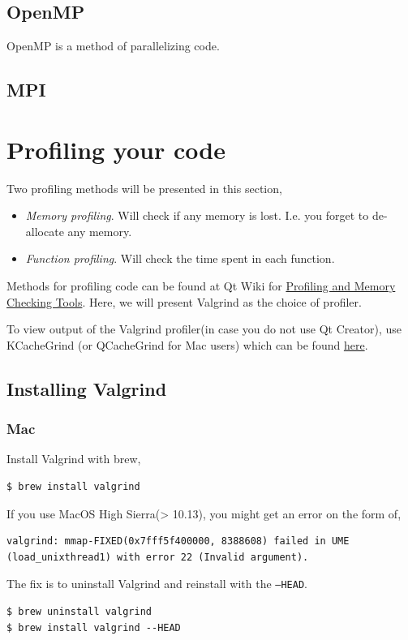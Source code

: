 \documentclass[11pt]{article}
\begin{document}
\subsection{OpenMP}
OpenMP is a method of parallelizing code.

\subsection{MPI}

\section{Profiling your code}
Two profiling methods will be presented in this section,
\begin{itemize}
    \item \textit{Memory profiling}. Will check if any memory is lost. I.e. you forget to de-allocate any memory.
    \item \textit{Function profiling}. Will check the time spent in each function.
\end{itemize}

Methods for profiling code can be found at Qt Wiki for \href{https://wiki.qt.io/Profiling_and_Memory_Checking_Tools}{Profiling and Memory Checking Tools}. Here, we will present Valgrind as the choice of profiler.

To view output of the Valgrind profiler(in case you do not use Qt Creator), use KCacheGrind (or QCacheGrind for Mac users) which can be found \href{https://github.com/KDE/kcachegrind}{here}.

\subsection{Installing Valgrind}
\subsubsection{Mac}
Install Valgrind with brew,
\begin{lstlisting}
$ brew install valgrind
\end{lstlisting}
If you use MacOS High Sierra(> 10.13), you might get an error on the form of,
\begin{lstlisting}
valgrind: mmap-FIXED(0x7fff5f400000, 8388608) failed in UME (load_unixthread1) with error 22 (Invalid argument).
\end{lstlisting}
The fix is to uninstall Valgrind and reinstall with the \texttt{--HEAD}.
\begin{lstlisting}
$ brew uninstall valgrind
$ brew install valgrind --HEAD
\end{lstlisting}
\end{document}
